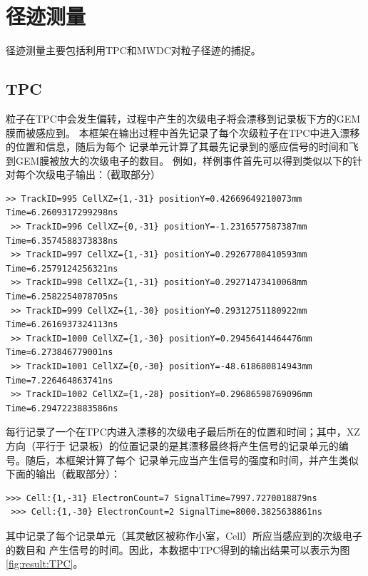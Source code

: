 \documentclass[bachelor,openany,oneside,color]{buaathesis}
\begin{document}
\section{径迹测量}

径迹测量主要包括利用TPC和MWDC对粒子径迹的捕捉。

\subsection{TPC}

粒子在TPC中会发生偏转，过程中产生的次级电子将会漂移到记录板下方的GEM膜而被感应到。
本框架在输出过程中首先记录了每个次级粒子在TPC中进入漂移的位置和信息，随后为每个
记录单元计算了其最先记录到的感应信号的时间和飞到GEM膜被放大的次级电子的数目。
例如，样例事件首先可以得到类似以下的针对每个次级电子输出：（截取部分）

\begin{lstlisting}[firstnumber=2650,lastline=2657]
 >> TrackID=995 CellXZ={1,-31} positionY=0.42669649210073mm Time=6.2609317299298ns
 >> TrackID=996 CellXZ={0,-31} positionY=-1.2316577587387mm Time=6.3574588373838ns
 >> TrackID=997 CellXZ={1,-31} positionY=0.29267780410593mm Time=6.2579124256321ns
 >> TrackID=998 CellXZ={1,-31} positionY=0.29271473410068mm Time=6.2582254078705ns
 >> TrackID=999 CellXZ={1,-30} positionY=0.29312751180922mm Time=6.2616937324113ns
 >> TrackID=1000 CellXZ={1,-30} positionY=0.29456414464476mm Time=6.273846779001ns
 >> TrackID=1001 CellXZ={0,-30} positionY=-48.618680814943mm Time=7.226464863741ns
 >> TrackID=1002 CellXZ={1,-28} positionY=0.29686598769096mm Time=6.2947223883586ns
\end{lstlisting}

每行记录了一个在TPC内进入漂移的次级电子最后所在的位置和时间；其中，XZ方向（平行于
记录板）的位置记录的是其漂移最终将产生信号的记录单元的编号。随后，本框架计算了每个
记录单元应当产生信号的强度和时间，并产生类似下面的输出（截取部分）：

\begin{lstlisting}[firstnumber=3384,lastline=3387]
 >>> Cell:{1,-31} ElectronCount=7 SignalTime=7997.7270018879ns
 >>> Cell:{1,-30} ElectronCount=2 SignalTime=8000.3825638861ns
\end{lstlisting}

其中记录了每个记录单元（其灵敏区被称作小室，Cell）所应当感应到的次级电子的数目和
产生信号的时间。因此，本数据中TPC得到的输出结果可以表示为图\ref{fig:result:TPC}。
\end{document}
